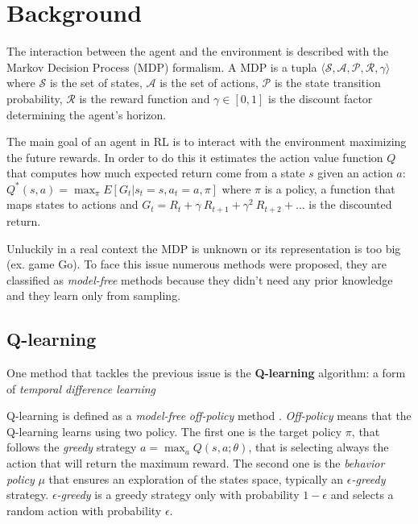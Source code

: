 \section{Background}

The interaction between the agent and the environment is described  with the
Markov Decision Process (MDP) formalism. A MDP is a tupla $\langle \mathcal{S}, 
\mathcal{A}, \mathcal{P}, \mathcal{R}, \gamma \rangle$ where $\mathcal{S}$ is
the set of states, $\mathcal{A}$ is the set of actions, $\mathcal{P}$ is the 
state transition probability, $\mathcal{R}$ is the reward function and 
$\gamma \in [0,1]$ is the discount factor determining the agent's horizon.

The main goal of an agent in RL is to interact with the environment maximizing the future rewards. In order to do this it estimates the action value function $Q$ that computes how much expected return come from a state $s$ given an action $a$: $Q^*(s, a) = \max_\pi E[ G_t | s_t = s, a_t = a, \pi]$ where $\pi$ is a policy, a function that maps states to actions and $G_t = R_t + \gamma~R_{t+1} + \gamma^2~R_{t+2} + \dots$ is the discounted return.


Unluckily in a real context the MDP is unknown or its representation is too big
(ex. game Go). To face this issue numerous methods were proposed, they are 
classified as \textit{model-free} methods because they didn't need any prior knowledge and they learn only from sampling.

\subsection{Q-learning}

One method that tackles the previous issue is the \textbf{Q-learning} algorithm: a form of \textit{temporal difference learning} \cite{Sutton:1998:IRL:551283}

Q-learning is defined as a \textit{model-free} \textit{off-policy} method \cite{Watkins1992}. \textit{Off-policy} means that the Q-learning learns using two policy. The first one is the target policy $\pi$, that follows the \textit{greedy} strategy $a = \max_a Q(s, a; \theta)$, that is selecting always the action that will return the maximum reward.
The second one is the \textit{behavior policy} $\mu$ that ensures an exploration of the states space, typically an \textit{$\epsilon$-greedy} strategy. \textit{$\epsilon$-greedy} is a greedy strategy only with probability $1 - \epsilon$ and selects a random action with probability $\epsilon$.

